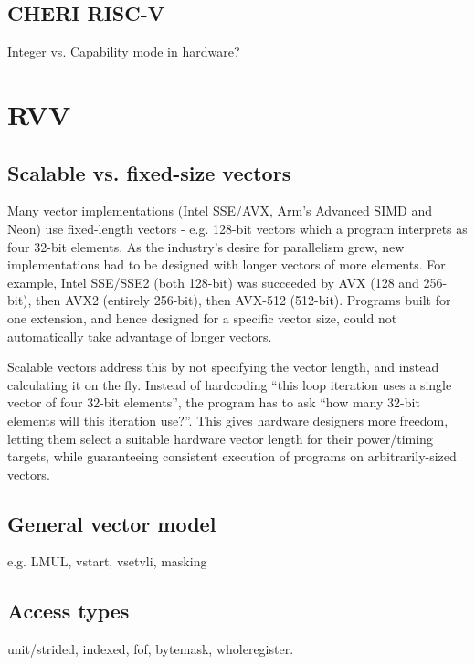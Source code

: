


\subsection{CHERI RISC-V}
Integer vs. Capability mode in hardware?

\section{RVV}\label{chap:bg:sec:rvv}

\subsection{Scalable vs. fixed-size vectors}
Many vector implementations (Intel SSE/AVX, Arm's Advanced SIMD and Neon) use fixed-length vectors - e.g. 128-bit vectors which a program interprets as four 32-bit elements.
As the industry's desire for parallelism grew, new implementations had to be designed with longer vectors of more elements.
For example, Intel SSE/SSE2 (both 128-bit) was succeeded by AVX (128 and 256-bit), then AVX2 (entirely 256-bit), then AVX-512 (512-bit).
Programs built for one extension, and hence designed for a specific vector size, could not automatically take advantage of longer vectors.

Scalable vectors address this by not specifying the vector length, and instead calculating it on the fly.
Instead of hardcoding \enquote{this loop iteration uses a single vector of four 32-bit elements}, the program has to ask \enquote{how many 32-bit elements will this iteration use?}.
This gives hardware designers more freedom, letting them select a suitable hardware vector length for their power/timing targets, while guaranteeing consistent execution of programs on arbitrarily-sized vectors.


\subsection{General vector model}
e.g. LMUL, vstart, vsetvli, masking

\subsection{Access types}
unit/strided,
indexed,
fof,
bytemask,
wholeregister.

